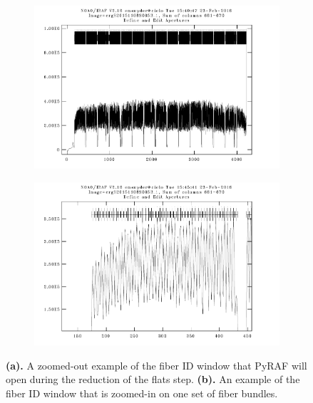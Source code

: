 \documentclass[12pt]{report}
\begin{document}
\begin{figure}[t]
\centering
\begin{subfigure}[t]{0.49\textwidth}
\includegraphics[width=\textwidth]{apertures1}
\end{subfigure}
\hfill
\begin{subfigure}[t]{0.49\textwidth}
\includegraphics[width=\textwidth]{apertures2}
\end{subfigure}
\caption[Examples of the Fiber ID Step]{\textbf{(a).} A zoomed-out example of the fiber ID window that PyRAF will open during the reduction of the flats step. \textbf{(b).} An example of the fiber ID window that is zoomed-in on one set of fiber bundles.}
\label{fig:aps}
\end{figure}
\end{document}
